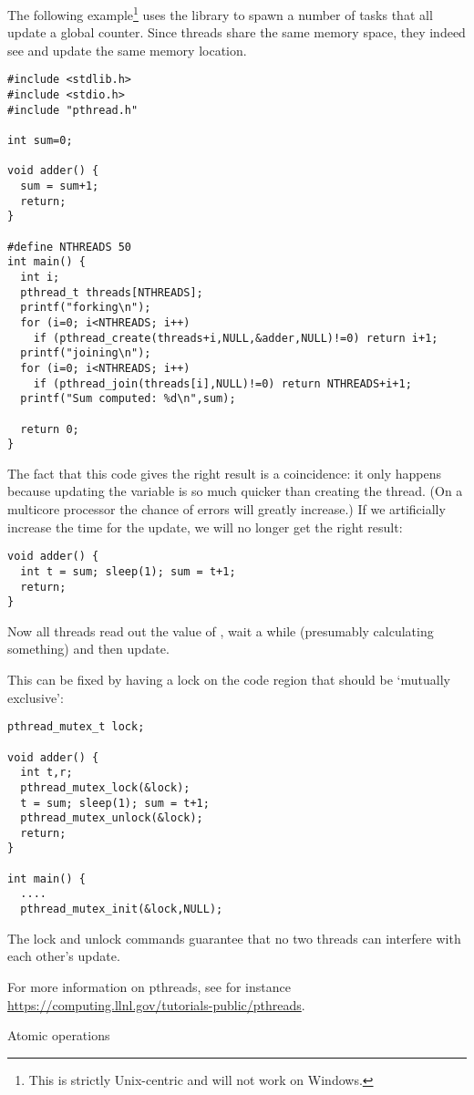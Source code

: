 The following example\footnote{This is strictly Unix-centric and will
  not work on Windows.} uses the  library to spawn
a number of tasks that all update a global counter. Since threads
share the same memory space, they indeed see and update the same
memory location.
\begin{verbatim}
#include <stdlib.h>
#include <stdio.h>
#include "pthread.h"

int sum=0;

void adder() {
  sum = sum+1;
  return;
}

#define NTHREADS 50
int main() {
  int i;
  pthread_t threads[NTHREADS];
  printf("forking\n");
  for (i=0; i<NTHREADS; i++)
    if (pthread_create(threads+i,NULL,&adder,NULL)!=0) return i+1;
  printf("joining\n");
  for (i=0; i<NTHREADS; i++)
    if (pthread_join(threads[i],NULL)!=0) return NTHREADS+i+1;
  printf("Sum computed: %d\n",sum);

  return 0;
}
\end{verbatim}
The fact that this code gives the right result is a
coincidence: it
only happens because updating the variable is so much quicker than
creating the thread. (On a multicore processor the chance of errors
will greatly increase.) If we artificially increase the time for the
update, we will no longer get the right result:
\begin{verbatim}
void adder() {
  int t = sum; sleep(1); sum = t+1;
  return;
}
\end{verbatim}
Now all threads read out the value of , wait a while
(presumably calculating something) and then update.

This can be fixed by having a lock on the code region that should be
`mutually exclusive':
\begin{verbatim}
pthread_mutex_t lock;

void adder() {
  int t,r;
  pthread_mutex_lock(&lock);
  t = sum; sleep(1); sum = t+1; 
  pthread_mutex_unlock(&lock);
  return;
}

int main() {
  ....
  pthread_mutex_init(&lock,NULL);

\end{verbatim}
The lock and unlock commands guarantee that no two threads can
interfere with each other's update.

For more information on pthreads, see for instance
\url{https://computing.llnl.gov/tutorials-public/pthreads}.

 {Atomic operations}
\label{sec:shared-lock}

